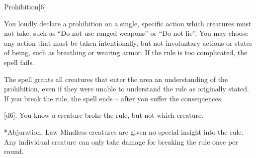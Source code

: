 \begin{spellsection}{Prohibition}[6]
    \begin{spellheader}
    \end{spellheader}
    \begin{spellcontent}
        \begin{spelltargetinginfo}
        \end{spelltargetinginfo}
        \begin{spelleffects}
            \spelleffect You loudly declare a prohibition on a single, specific action which creatures must not take, such as ``Do not use ranged weapons'' or ``Do not lie''. You may choose any action that must be taken intentionally, but not involuntary actions or states of being, such as breathing or wearing armor. If the rule is too complicated, the spell fails.

            The spell grants all creatures that enter the area an understanding of the prohibition, even if they were unable to understand the rule as originally stated. If you break the rule, the spell ends -- after you suffer the consequences.
            \spelldur \durshort
        \end{spelleffects}
    \end{spellcontent}
    \begin{spellsubcontent}
        \begin{spelltargetinginfo}
        \end{spelltargetinginfo}
        \begin{spelleffects}
            \spelleffect {}[d6]. You know a creature broke the rule, but not which creature.
        \end{spelleffects}
    \end{spellsubcontent}
    \begin{spellfooter}
        *{Abjuration, Law}
        \spellnotes Mindless creatures are given no special insight into the rule. Any individual creature can only take damage for breaking the rule once per round.
        \miscastexplode
    \end{spellfooter}
\end{spellsection}

